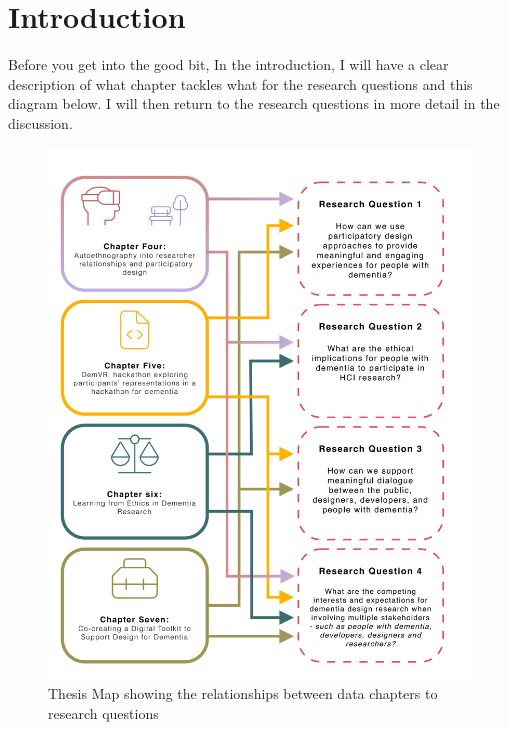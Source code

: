 \chapter{Introduction}


Before you get into the good bit, In the introduction, I will have a clear description of what chapter tackles what for the research questions and this diagram below. I will then return to the research questions in more detail in the discussion.

\begin{figure}[htp]
\centering
\includegraphics[width=.8\linewidth]{Images/Thesis_Narrative/RQ_and_Chapters.png}
\caption{Thesis Map showing the relationships between data chapters to research questions}
\label{fig:RQ_and_Chapters}
\end{figure}